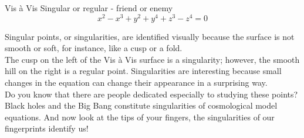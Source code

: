 \begin{surferPage}{Vis \`a Vis}
Singular or regular - friend or enemy\\
\smallskip
\[x^2	- x^3+ y^2+ y^4+ z^3- z^4	=  0\]

\vspace{0.3cm}
Singular points, or singularities, are identified visually because the surface is not smooth or soft, for instance, like a cusp or a fold.\\
\vspace{0.3cm}
The cusp on the left of the Vis \`a Vis surface is a singularity; however, the smooth hill on the right is a regular point. Singularities are interesting because small changes in the equation can change their appearance in a surprising way. \\

\vspace{0.3cm}
Do you know that there are people dedicated especially to studying these points? Black holes and the Big Bang constitute singularities of cosmological model equations. And now look at the tips of your fingers, the singularities of our fingerprints identify us!
\end{surferPage}
